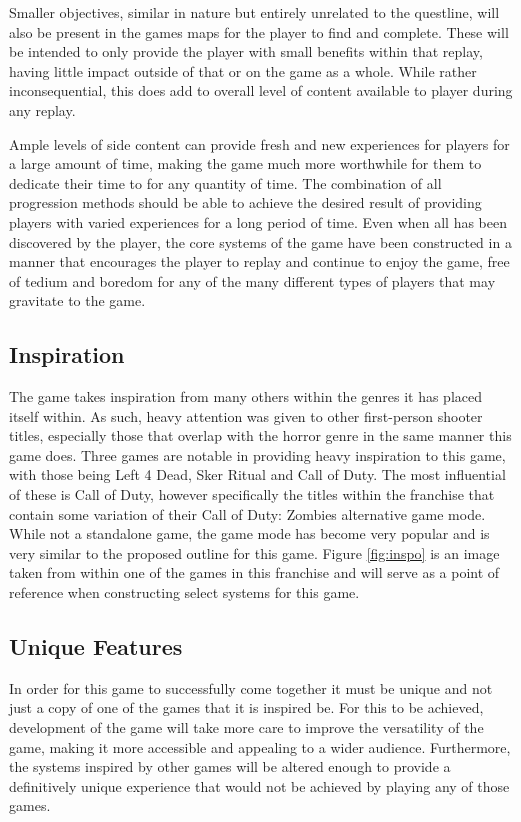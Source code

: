 \documentclass[11pt]{article}
\begin{document}
Smaller objectives, similar in nature but entirely unrelated to the questline, will also be present
in the games maps for the player to find and complete. These will be intended to only provide the
player with small benefits within that replay, having little impact outside of that or on the game
as a whole. While rather inconsequential, this does add to overall level of content available to
player during any replay.

Ample levels of side content can provide fresh and new experiences for players for a large amount
of time, making the game much more worthwhile for them to dedicate their time to for any quantity
of time. The combination of all progression methods should be able to achieve the desired result of
providing players with varied experiences for a long period of time. Even when all has been
discovered by the player, the core systems of the game have been constructed in a manner that
encourages the player to replay and continue to enjoy the game, free of tedium and boredom for any
of the many different types of players that may gravitate to the game. \\

\subsection{Inspiration}
The game takes inspiration from many others within the genres it has placed itself within. As such,
heavy attention was given to other first-person shooter titles, especially those that overlap with
the horror genre in the same manner this game does. Three games are notable in providing heavy
inspiration to this game, with those being Left 4 Dead, Sker Ritual and Call of Duty. The most
influential of these is Call of Duty, however specifically the titles within the franchise that
contain some variation of their Call of Duty: Zombies alternative game mode. While not a standalone
game, the game mode has become very popular and is very similar to the proposed outline for this
game. Figure \ref{fig:inspo} is an image taken from within one of the games in this franchise and
will serve as a point of reference when constructing select systems for this game. \\

\subsection{Unique Features}
In order for this game to successfully come together it must be unique and not just a copy of one
of the games that it is inspired be. For this to be achieved, development of the game will take
more care to improve the versatility of the game, making it more accessible and appealing to a
wider audience. Furthermore, the systems inspired by other games will be altered enough to provide
a definitively unique experience that would not be achieved by playing any of those games. \\
\end{document}
